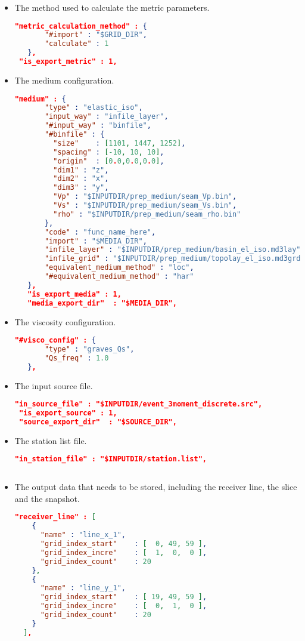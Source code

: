 \begin{itemize}
\item The method used to calculate the metric parameters.
\begin{lstlisting}[language=json,
 frame=tb]    
 "metric_calculation_method" : {
       "#import" : "$GRID_DIR",
       "calculate" : 1
   },
 "is_export_metric" : 1,
\end{lstlisting}
\item The medium configuration.
\begin{lstlisting}[language=json,
 frame=tb]    
 "medium" : {
       "type" : "elastic_iso",
       "input_way" : "infile_layer",
       "#input_way" : "binfile",
       "#binfile" : {
         "size"    : [1101, 1447, 1252],
         "spacing" : [-10, 10, 10],
         "origin"  : [0.0,0.0,0.0],
         "dim1" : "z",
         "dim2" : "x",
         "dim3" : "y",
         "Vp" : "$INPUTDIR/prep_medium/seam_Vp.bin",
         "Vs" : "$INPUTDIR/prep_medium/seam_Vs.bin",
         "rho" : "$INPUTDIR/prep_medium/seam_rho.bin"
       },
       "code" : "func_name_here",
       "import" : "$MEDIA_DIR",
       "infile_layer" : "$INPUTDIR/prep_medium/basin_el_iso.md3lay",
       "infile_grid" : "$INPUTDIR/prep_medium/topolay_el_iso.md3grd",
       "equivalent_medium_method" : "loc",
       "#equivalent_medium_method" : "har"
   },
   "is_export_media" : 1,
   "media_export_dir"  : "$MEDIA_DIR",
\end{lstlisting}
\item The viscosity configuration.

\begin{lstlisting}[language=json,
 frame=tb]    
 "#visco_config" : {
       "type" : "graves_Qs",
       "Qs_freq" : 1.0
   },
\end{lstlisting}
\item The input source file.
\begin{lstlisting}[language=json,
 frame=tb]    
 "in_source_file" : "$INPUTDIR/event_3moment_discrete.src",
 "is_export_source" : 1,
 "source_export_dir"  : "$SOURCE_DIR",
\end{lstlisting}
\item The station list file.
\begin{lstlisting}[language=json,
 frame=tb]    
"in_station_file" : "$INPUTDIR/station.list",
 
\end{lstlisting}
\item The output data that needs to be stored, including the receiver line, the slice and the snapshot.
\begin{lstlisting}[language=json,
 frame=tb]    
"receiver_line" : [
    {
      "name" : "line_x_1",
      "grid_index_start"    : [  0, 49, 59 ],
      "grid_index_incre"    : [  1,  0,  0 ],
      "grid_index_count"    : 20
    },
    {
      "name" : "line_y_1",
      "grid_index_start"    : [ 19, 49, 59 ],
      "grid_index_incre"    : [  0,  1,  0 ],
      "grid_index_count"    : 20
    } 
  ],


\end{lstlisting}
\end{itemize}
